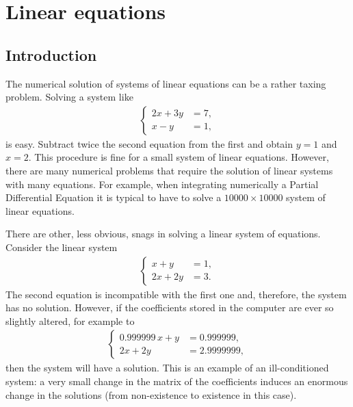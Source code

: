 
\chapter{Linear equations}

\section{Introduction}

The numerical solution of systems of linear equations can be a rather
taxing problem.    Solving a system like 
%
\begin{align*}
  \left\{
    \begin{aligned}
      2 x + 3 y & = 7, \\ 
      x - y & = 1,
    \end{aligned} \right.
\end{align*}
%
is easy.  Subtract twice the second equation from the first and obtain
$y=1$ and $x=2$.  This procedure is fine  for a small system of linear
equations.  However,  there are many  numerical  problems that require
the solution of linear systems with many equations.  For example, when
integrating numerically a Partial Differential  Equation it is typical
to have to solve a $10000 \times 10000$ system of linear equations.

There are other, less obvious, snags in solving a linear system of
equations.     Consider the linear system
%
\begin{align*}
  \left\{
    \begin{aligned}
      x + y & = 1, \\
      2 x + 2 y & = 3.
    \end{aligned} \right.
\end{align*}
%
The second equation is incompatible with the first one and, therefore,
the system has no solution.    However, if the coefficients stored in
the computer are ever so slightly altered, for example to
%
\begin{align*}
  \left\{
    \begin{aligned}
      0.999999 \, x + y & = 0.999999, \\
      2 x + 2 y &= 2.9999999 ,
    \end{aligned} \right.
\end{align*}
%
then the system will have a solution.    This is an example of an
ill-conditioned system: a very small change in the matrix of the
coefficients induces an enormous change in the solutions (from
non-existence to existence in this case).

